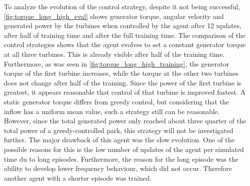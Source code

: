 To analyze the evolution of the control strategy, despite it not being successful, \autoref{fig:torque_long_high_eval} shows generator torque, angular velocity and generated power by the turbines when controlled by the agent after 12 updates, after half of training time and after the full training time. The comparison of the control strategies shows that the agent evolves to set a constant generator torque at all three turbines. This is already visible after half of the training time. Furthermore, as was seen in \autoref{fig:torque_long_high_training}, the generator torque of the first turbine increases, while the torque at the other two turbines does not change after half of the training. Since the power of the first turbine is greatest, it appears reasonable that control of that turbine is improved fastest. A static generator torque differs from greedy control, but considering that the inflow has a uniform mean value, such a strategy still can be reasonable. However, since the total generated power only reached about three quarter of the total power of a greedy-controlled park, this strategy will not be investigated further. The major drawback of this agent was the slow evolution. One of the possible reasons for this is the low number of updates of the agent per simulated time du to long episodes. Furthermore, the reason for the long episode was the ability to develop lower frequency behaviour, which did not occur. Therefore another agent with a shorter episode  was trained.
